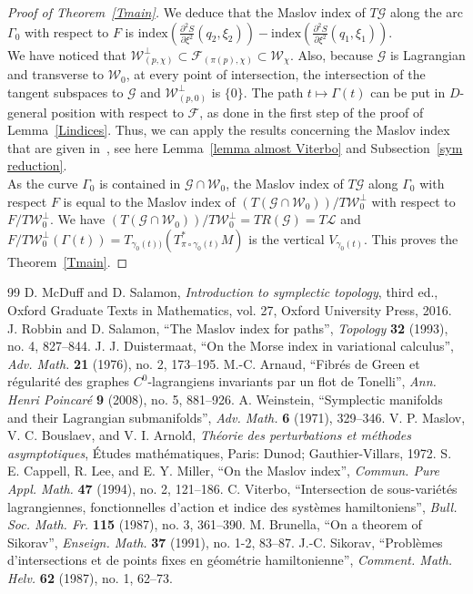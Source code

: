 \documentclass[10pt,a4paper]{amsart}
\numberwithin{equation}{section}
\newcommand*\cF{\mathcal{F}}
\newcommand*\cg{\mathcal{G}}
\newcommand*\cl{\mathcal{L}}
\newcommand*\cw{\mathcal{W}}
\theoremstyle{definition}
\theoremstyle{remark}
\begin{document}
\begin{proof}[Proof of Theorem~\ref{Tmain}]
We deduce that the Maslov index of $T\cg$ along the arc $\Gamma_0$ with respect to $F$ is $\text{index}(\frac{\partial^2 S}{\partial \xi^2}(q_2, \xi_2))-\text{index}(\frac{\partial^2 S}{\partial \xi^2}(q_1, \xi_1))$.\\
We have noticed that $\cw^\bot_{(p,\chi)} \subset \cF_{(\pi(p),\chi)}\subset \cw_\chi$. Also, because $\cg$ is Lagrangian and transverse to $\cw_0$, at every point of intersection, the intersection of the tangent subspaces to $\cg$ and $\cw^\bot_{(p,0)}$ is $\{ 0\}$. {The path $t\mapsto \Gamma(t)$ can be put in $D$-general position with respect to $\cF$, as done in the first step of the proof of Lemma~\ref{Lindices}. Thus, we can apply the results concerning the Maslov index that are given in~\cite[Section~2]{Vit1987}, see here Lemma~\ref{lemma almost Viterbo} and Subsection~\ref{sym reduction}}.
\\
As the curve $\Gamma_0$ is contained in $\cg\cap \cw_0$, the Maslov index of $T\cg$ along $\Gamma_0$ with respect $F$ is equal to the Maslov index of $(T(\cg\cap \cw_0))/T\cw^\bot_0$ with respect to $F/T\cw^\bot_0$. We have $(T(\cg\cap \cw_0))/T\cw^\bot_0={ T}R(\cg)={ T}\cl$ and $F/T\cw^\bot_0(\Gamma(t))=T_{\gamma_0(t))}(T^*_{\pi\circ \gamma_0(t)}M)$ is the vertical {$V_{\gamma_0(t)}$}. This proves the Theorem~\ref{Tmain}.
\end{proof}

\begin{thebibliography}{99}
 D. McDuff and D. Salamon, \emph{Introduction to symplectic topology}, third ed., Oxford Graduate Texts in Mathematics, vol. 27, Oxford University Press, 2016.
 J. Robbin and D. Salamon, ``The Maslov index for paths'', \emph{Topology} \textbf{32} (1993), no. 4, 827--844.
 J. J. Duistermaat, ``On the Morse index in variational calculus'', \emph{Adv. Math.} \textbf{21} (1976), no. 2, 173--195.
 M.-C. Arnaud, ``Fibr\'es de Green et r\'egularit\'e des graphes $C^0$-lagrangiens invariants par un flot de Tonelli'', \emph{Ann. Henri Poincar\'e} \textbf{9} (2008), no. 5, 881--926.
 A. Weinstein, ``Symplectic manifolds and their Lagrangian submanifolds'', \emph{Adv. Math.} \textbf{6} (1971), 329--346.
 V. P. Maslov, V. C. Bouslaev, and V. I. Arnol\'d, \emph{Th\'eorie des perturbations et m\'ethodes asymptotiques}, \'Etudes math\'ematiques, Paris: Dunod; Gauthier-Villars, 1972.
 S. E. Cappell, R. Lee, and E. Y. Miller, ``On the Maslov index'', \emph{Commun. Pure Appl. Math.} \textbf{47} (1994), no. 2, 121--186.
 C. Viterbo, ``Intersection de sous-vari\'et\'es lagrangiennes, fonctionnelles d'action et indice des syst\`emes hamiltoniens'', \emph{Bull. Soc. Math. Fr.} \textbf{115} (1987), no. 3, 361--390.
 M. Brunella, ``On a theorem of Sikorav'', \emph{Enseign. Math.} \textbf{37} (1991), no. 1-2, 83--87.
 J.-C. Sikorav, ``Probl\`emes d'intersections et de points fixes en g\'eom\'etrie hamiltonienne'', \emph{Comment. Math. Helv.} \textbf{62} (1987), no. 1, 62--73.
\end{thebibliography}
\end{document}
